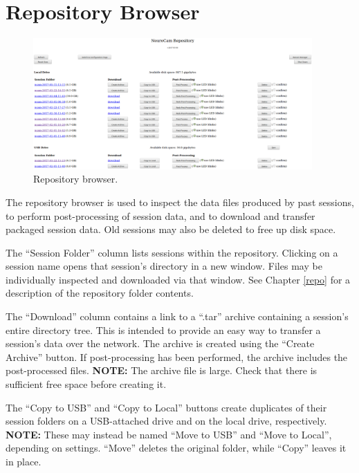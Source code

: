 \section{Repository Browser}
\label{gui-repo}

\begin{figure}[h]
\begin{center}
\includegraphics[width=0.95\textwidth]{pics-gui/gui-browser.png}
\end{center}
\caption{Repository browser.}\label{fig-gui-repo}
\end{figure}


The repository browser is used to inspect the data files produced by
past sessions, to perform post-processing of session data, and to download
and transfer packaged session data. Old sessions may also be deleted to free 
up disk space.

The ``Session Folder'' column lists sessions within the repository. Clicking
on a session name opens that session's directory in a new window. Files may
be individually inspected and downloaded via that window. See Chapter 
\ref{repo} for a description of the repository folder contents.

The ``Download'' column contains a link to a ``.tar'' archive containing
a session's entire directory tree. This is intended to provide an easy way
to transfer a session's data over the network. The archive is created using 
the ``Create Archive'' button. If post-processing has been performed, the 
archive includes the post-processed files. \textbf{NOTE:} The archive file 
is large. Check that there is sufficient free space before creating it.

The ``Copy to USB'' and ``Copy to Local'' buttons create duplicates of their
session folders on a USB-attached drive and on the local drive, respectively.
\textbf{NOTE:} These may instead be named ``Move to USB'' and ``Move to 
Local'', depending on settings. ``Move'' deletes the original folder, while
``Copy'' leaves it in place.

